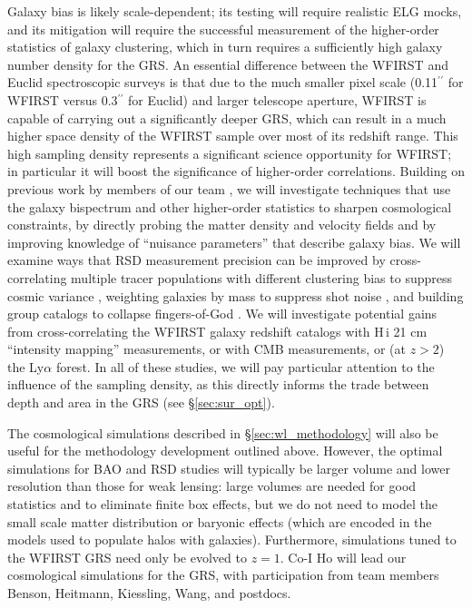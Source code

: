Galaxy bias is likely scale-dependent; its testing will require realistic ELG mocks, and its mitigation will require 
the successful measurement of the higher-order statistics of galaxy clustering, which in turn requires a 
sufficiently high galaxy number density for the GRS. 
An essential difference between the WFIRST and Euclid spectroscopic
surveys is that due to the much smaller pixel scale (0.11$^{\prime\prime}$ for WFIRST
versus 0.3$^{\prime\prime}$ for Euclid) and larger telescope aperture, WFIRST 
is capable of carrying out a significantly deeper GRS, which can result in
a much higher space density of the WFIRST sample over most
of its redshift range.
This high sampling density represents a significant science opportunity
for WFIRST; 
in particular it will boost the significance of higher-order correlations. 
Building on previous work by members of our team \cite{Takada08,Schaan14,Dore14,Chen15},
we will investigate techniques that use the galaxy
bispectrum and other higher-order statistics to sharpen cosmological
constraints, by directly probing the matter density and velocity fields
and by improving knowledge of ``nuisance parameters'' that describe
galaxy bias.  We will examine ways that RSD measurement precision
can be improved by cross-correlating multiple tracer populations
with different clustering bias to suppress cosmic 
variance \cite{mcDonald2009,Bernstein2011,dePutter:2014lna}, weighting galaxies by mass
to suppress shot noise \cite{Seljak2009}, and building group catalogs
to collapse fingers-of-God \cite{Reid2010}.
We will investigate potential gains from cross-correlating the
WFIRST galaxy redshift catalogs with H$\,${\sc i} 21 cm ``intensity mapping''
measurements, or with CMB measurements, or (at $z>2$) the Ly$\alpha$ forest.
In all of these studies, we will pay particular attention to 
the influence of the sampling density, as this directly informs
the trade between depth and area in the GRS (see \S\ref{sec:sur_opt}).

 The cosmological simulations described in \S\ref{sec:wl_methodology} 
will also be useful for the methodology development outlined above.
However, the optimal simulations for BAO and RSD studies will typically
be larger volume and lower resolution than those for weak lensing:
large volumes are needed for good statistics and to eliminate finite
box effects, but we do not need to model the small scale matter 
distribution or baryonic effects (which are encoded in the 
models used to populate halos with galaxies).  Furthermore, 
simulations tuned to the WFIRST GRS need only be evolved to $z=1$.
Co-I Ho will lead our cosmological simulations for the GRS, with participation from
team members Benson, Heitmann, Kiessling, Wang, and postdocs.

